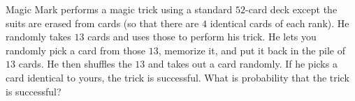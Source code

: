 Magic Mark performs a magic trick using a standard $52$-card deck except the suits are erased from cards (so that there are $4$ identical cards of each rank). He randomly takes $13$ cards and uses those to perform his trick. He lets you randomly pick a card from those $13$, memorize it, and put it back in the pile of $13$ cards. He then shuffles the $13$ and takes out a card randomly. If he picks a card identical to yours, the trick is successful. What is probability that the trick is successful?